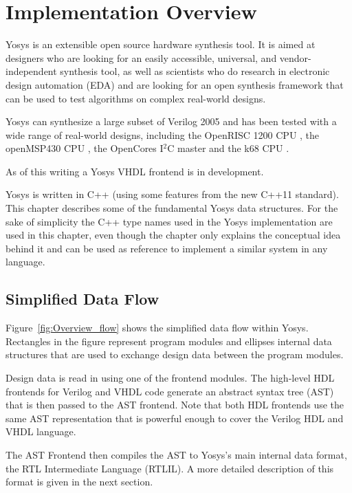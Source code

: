 
\chapter{Implementation Overview}
\label{chapter:overview}

Yosys is an extensible open source hardware synthesis tool. It is aimed at
designers who are looking for an easily accessible, universal, and
vendor-independent synthesis tool, as well as scientists who do research in
electronic design automation (EDA) and are looking for an open synthesis
framework that can be used to test algorithms on complex real-world designs.

Yosys can synthesize a large subset of Verilog 2005 and has been tested with a
wide range of real-world designs, including the OpenRISC 1200 CPU
, the openMSP430 CPU , the
OpenCores I$^2$C master  and the k68 CPU .

As of this writing a Yosys VHDL frontend is in development.

Yosys is written in C++ (using some features from the new C++11 standard). This
chapter describes some of the fundamental Yosys data structures. For the sake
of simplicity the C++ type names used in the Yosys implementation are used in
this chapter, even though the chapter only explains the conceptual idea behind
it and can be used as reference to implement a similar system in any language.

\section{Simplified Data Flow}

Figure~\ref{fig:Overview_flow} shows the simplified data flow within Yosys.
Rectangles in the figure represent program modules and ellipses internal
data structures that are used to exchange design data between the program
modules.

Design data is read in using one of the frontend modules. The high-level HDL
frontends for Verilog and VHDL code generate an abstract syntax tree (AST) that
is then passed to the AST frontend. Note that both HDL frontends use the same
AST representation that is powerful enough to cover the Verilog HDL and VHDL
language.

The AST Frontend then compiles the AST to Yosys's main internal data format,
the RTL Intermediate Language (RTLIL). A more detailed description of this format
is given in the next section.

